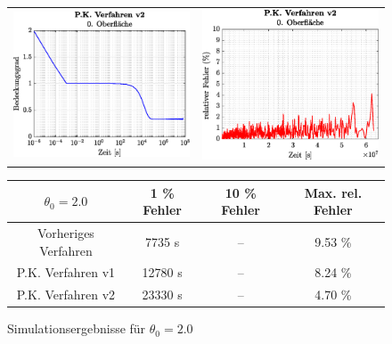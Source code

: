 \documentclass{listhesis}
\begin{document}
\begin{figure}[!h]
\begin{tabular}{@{}cc@{}}
\includegraphics[width=\ws\textwidth]{./include/figure_2.0/PC_new/CovFacet0.eps}&
\includegraphics[width=\ws\textwidth]{./include/figure_2.0/PC_new/CovFacetError0.eps}
\end{tabular}
\newline
\vspace*{0.5cm}
\newline
\begin{tabular}{|c|c|c|c|}
\hline
$\theta_0 = 2.0$ & 1 \% Fehler & 10 \% Fehler & Max. rel. Fehler\\
\hline
Vorheriges Verfahren & 7735 s & -- & 9.53 \% \\
P.K. Verfahren v1 & 12780 s & -- & 8.24 \% \\
P.K. Verfahren v2 & 23330 s & -- & 4.70 \% \\
\hline
\end{tabular}
\caption{Simulationsergebnisse für $\theta_0 = 2.0$}
\label{fig:figure_2.0}
\end{figure}
\end{document}
